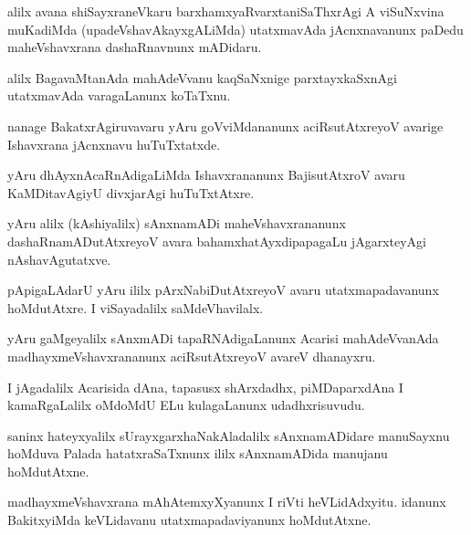 \documentclass{article}
\begin{document}
\begin{mn}
alilx avana shiSayxraneVkaru barxhamxyaRvarxtaniSaThxrAgi A viSuNxvina muKadiMda 
(upadeVshavAkayxgALiMda) utatxmavAda jAcnxnavanunx paDedu maheVshavxrana dashaRnavnunx mADidaru.
\end{mn}

\begin{mn}
alilx BagavaMtanAda mahAdeVvanu kaqSaNxnige parxtayxkaSxnAgi utatxmavAda varagaLanunx koTaTxnu.
\end{mn}

\begin{mn}
nanage BakatxrAgiruvavaru yAru goVviMdananunx aciRsutAtxreyoV avarige Ishavxrana jAcnxnavu 
huTuTxtatxde.
\end{mn}

\begin{mn}
yAru dhAyxnAcaRnAdigaLiMda Ishavxrananunx BajisutAtxroV avaru KaMDitavAgiyU divxjarAgi huTuTxtAtxre.
\end{mn}

\begin{mn}
yAru alilx (kAshiyalilx) sAnxnamADi maheVshavxrananunx dashaRnamADutAtxreyoV avara 
bahamxhatAyxdipapagaLu jAgarxteyAgi nAshavAgutatxve.
\end{mn}

\begin{mn}
pApigaLAdarU yAru ililx pArxNabiDutAtxreyoV avaru utatxmapadavanunx hoMdutAtxre. I viSayadalilx 
saMdeVhavilalx.
\end{mn}

\begin{mn}
yAru gaMgeyalilx sAnxmADi tapaRNAdigaLanunx Acarisi mahAdeVvanAda madhayxmeVshavxrananunx 
aciRsutAtxreyoV avareV dhanayxru.
\end{mn}

\begin{mn}
I jAgadalilx Acarisida dAna, tapasusx shArxdadhx, piMDaparxdAna I kamaRgaLalilx oMdoMdU ELu 
kulagaLanunx  udadhxrisuvudu.
\end{mn}

\begin{mn}
saninx hateyxyalilx sUrayxgarxhaNakAladalilx sAnxnamADidare manuSayxnu hoMduva Palada 
hatatxraSaTxnunx ililx sAnxnamADida manujanu hoMdutAtxne.
\end{mn}

\begin{mn}
madhayxmeVshavxrana mAhAtemxyXyanunx I riVti heVLidAdxyitu. idanunx BakitxyiMda keVLidavanu 
utatxmapadaviyanunx hoMdutAtxne.
\end{mn}
\end{document}

